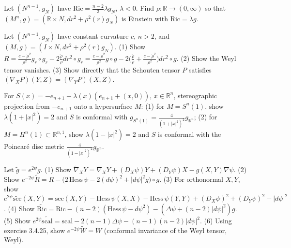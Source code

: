 \begin{remark}
  \label{rem:pet-ch4-ex-11}

  Let $(N^{n-1},g_N)$ have $\mathrm{Ric}=\tfrac{n-2}2\lambda g_N$, $\lambda<0$.
  Find $\rho:\mathbb{R}\to(0,\infty)$ so that $(M^n,g)=(\mathbb{R}\times N,dr^2+\rho^2(r)g_N)$
  is Einstein with $\mathrm{Ric}=\lambda g$.
\end{remark}

\begin{remark}
  \label{rem:pet-ch4-ex-12}

  Let $(N^{n-1},g_N)$ have constant curvature $c$, $n>2$, and
  $(M,g)=(I\times N,dr^2+\rho^2(r)g_N)$. (1) Show
  $R=\tfrac{c-\dot\rho^2}{\rho^2}g_r\circ g_r-2\tfrac{\ddot\rho}\rho dr^2\circ g_r
  =\tfrac{c-\dot\rho^2}{\rho^2}g\circ g-2\big(\tfrac{\ddot\rho}\rho+\tfrac{c-\dot\rho^2}{\rho^2}\big)dr^2\circ g$.
  (2) Show the Weyl tensor vanishes. (3) Show directly that the Schouten
  tensor $P$ satisfies $(\nabla_XP)(Y,Z)=(\nabla_YP)(X,Z)$.
\end{remark}

\begin{remark}
  \label{rem:pet-ch4-ex-13}

  For $S(x)=-e_{n+1}+\lambda(x)(e_{n+1}+(x,0))$, $x\in\mathbb{R}^n$, stereographic
  projection from $-e_{n+1}$ onto a hypersurface $M$: (1) for $M=S^n(1)$, show
  $\lambda(1+|x|^2)=2$ and $S$ is conformal with
  $g_{S^n(1)}=\tfrac4{(1+|x|^2)^2}g_{\mathbb{R}^n}$; (2) for $M=H^n(1)\subset\mathbb{R}^{n,1}$,
  show $\lambda(1-|x|^2)=2$ and $S$ is conformal with the Poincaré disc metric
  $\tfrac4{(1-|x|^2)^2}g_{\mathbb{R}^n}$.
\end{remark}

\begin{remark}
  \label{rem:pet-ch4-ex-14}

  Let $\tilde g=e^{2\psi}g$. (1) Show
  $\tilde\nabla_XY=\nabla_XY+(D_X\psi)Y+(D_Y\psi)X-g(X,Y)\nabla\psi$. (2) Show
  $e^{-2\psi}\tilde R=R-\big(2\,\mathrm{Hess}\,\psi-2(d\psi)^2+|d\psi|^2g\big)\circ g$.
  (3) For orthonormal $X,Y$, show
  $e^{2\psi}\widetilde{\mathrm{sec}}(X,Y)=\mathrm{sec}(X,Y)-\mathrm{Hess}\,\psi(X,X)-\mathrm{Hess}\,\psi(Y,Y)+(D_X\psi)^2+(D_Y\psi)^2-|d\psi|^2$.
  (4) Show
  $\widetilde{\mathrm{Ric}}=\mathrm{Ric}-(n-2)(\mathrm{Hess}\,\psi-d\psi^2)-(\Delta\psi+(n-2)|d\psi|^2)g$.
  (5) Show $e^{2\psi}\widetilde{\mathrm{scal}}=\mathrm{scal}-2(n-1)\Delta\psi-(n-1)(n-2)|d\psi|^2$.
  (6) Using exercise 3.4.25, show $e^{-2\psi}\tilde W=W$ (conformal invariance
  of the Weyl tensor, Weyl).
\end{remark}

